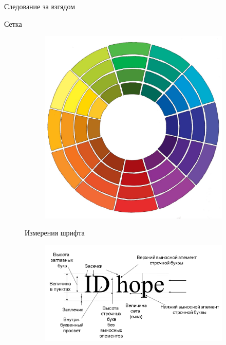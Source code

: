 \documentclass{beamer}
\begin{document}
\begin{frame}[t]{Следование за взгядом}
\begin{frame}[t]{Сетка}
\begin{figure}[h]
\begin{frame}[t]
	\begin{figure}[h]
		\centering
		\includegraphics[scale=0.15]{images/color.jpg}
	\end{figure}
\end{frame}  

\begin{frame}[t]{Измерения шрифта}
	\begin{figure}[h]
		\centering
		\includegraphics[scale=0.5]{images/lec05-pic05.png}
	\end{figure}
\end{frame}  


\end{figure}
\end{frame}
\end{frame}
\end{document}
